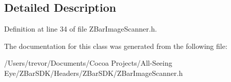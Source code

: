\subsection{Detailed Description}


Definition at line 34 of file ZBarImageScanner.h.



The documentation for this class was generated from the following file:\begin{DoxyCompactItemize}
\item 
/Users/trevor/Documents/Cocoa Projects/All-\/Seeing Eye/ZBarSDK/Headers/ZBarSDK/ZBarImageScanner.h\end{DoxyCompactItemize}
